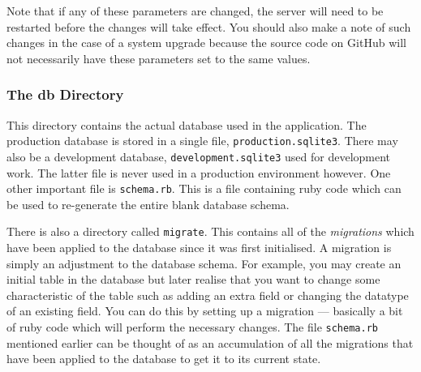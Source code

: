 \documentclass[12pt,twoside]{article}
\begin{document}
\begin{plainblock}
Note that if any of these parameters are changed, the server will need
to be restarted before the changes will take effect. You should also
make a note of such changes in the case of a system upgrade because
the source code on GitHub will not necessarily have these parameters
set to the same values.
\end{plainblock}

\subsubsection{The db Directory}
This directory contains the actual database used in the application.
The production database is stored in a single file, \verb=production.sqlite3=.
There may also be a development database, \verb=development.sqlite3= used
for development work. The latter file is never used in a production environment
however. One other important file is \verb=schema.rb=. This is a file
containing ruby code which can be used to re-generate the entire blank
database schema.

There is also a directory called \verb=migrate=. This contains all of the
\emph{migrations} which have been applied to the database since it was
first initialised. A migration is simply an adjustment to the database
schema. For example, you may create an initial table in the database but
later realise that you want to change some characteristic of the table
such as adding an extra field or changing the datatype of an existing field.
You can do this by setting up a migration --- basically a bit of ruby code
which will perform the necessary changes. 
The file \verb=schema.rb= mentioned earlier can be
thought of as an accumulation of all the migrations that have been applied
to the database to get it to its current state.
\end{document}
